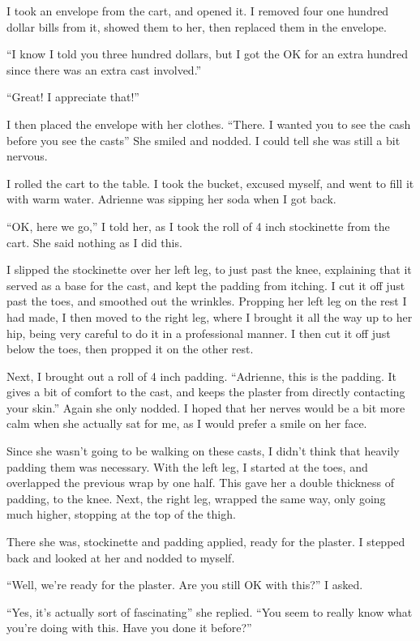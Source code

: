 I took an envelope from the cart, and opened it. I removed four one hundred dollar bills
from it, showed them to her, then replaced them in the envelope.

``I know I told you three hundred dollars, but I got the OK for an extra hundred since there
was an extra cast involved.''

``Great! I appreciate that!''

I then placed the envelope with her clothes. ``There. I wanted you to see the cash before
you see the casts'' She smiled and nodded. I could tell she was still a bit nervous.

I rolled the cart to the table. I took the bucket, excused myself, and went to fill it with
warm water. Adrienne was sipping her soda when I got back.

``OK, here we go,'' I told her, as I took the roll of 4 inch stockinette from the cart. She
said nothing as I did this.

I slipped the stockinette over her left leg, to just past the knee, explaining that it
served as a base for the cast, and kept the padding from itching. I cut it off just past the
toes, and smoothed out the wrinkles. Propping her left leg on the rest I had made, I then moved
to the right leg, where I brought it all the way up to her hip, being very careful to do it in a
professional manner. I then cut it off just below the toes, then propped it on the other rest.

Next, I brought out a roll of 4 inch padding. ``Adrienne, this is the padding. It gives a
bit of comfort to the cast, and keeps the plaster from directly contacting your skin.'' Again
she only nodded. I hoped that her nerves would be a bit more calm when she actually sat for me,
as I would prefer a smile on her face.

Since she wasn't going to be walking on these casts, I didn't think that heavily padding
them was necessary. With the left leg, I started at the toes, and overlapped the previous wrap
by one half. This gave her a double thickness of padding, to the knee. Next, the right leg,
wrapped the same way, only going much higher, stopping at the top of the thigh.

There she was, stockinette and padding applied, ready for the plaster. I stepped back and
looked at her and nodded to myself.

``Well, we're ready for the plaster. Are you still OK with this?'' I asked.

``Yes, it's actually sort of fascinating'' she replied. ``You seem to really know what
you're doing with this. Have you done it before?''

